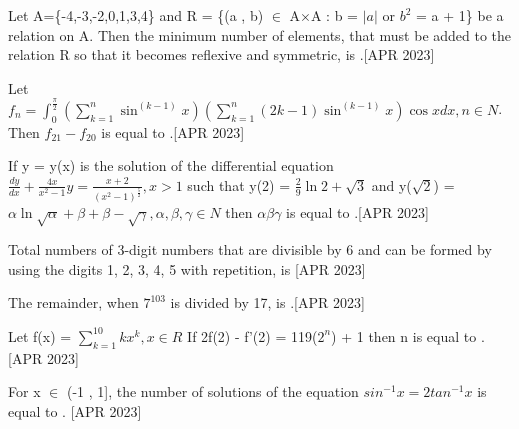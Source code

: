 \iffalse
  \title{Assignment}
  \author{ee24btech11030}
  \section{integer}
\fi

 \item Let A=\{-4,-3,-2,0,1,3,4\} and R = \{(a , b) $\in$ A$\times$A : b = $|a|$ or $b^2$ = a + 1\} be a relation on A. Then the minimum number of elements, that must be added to the relation R so that it becomes reflexive and symmetric, is  \underline{\hspace{1cm}}.\hfill{[APR 2023]}
    \bigskip
    
    \item Let $f_n = \int_{0}^{\frac{\pi}{2}}\left(\sum_{k=1}^{n}\sin^{(k - 1)}{x}\right)\left(\sum_{k=1}^{n}(2k - 1)\sin^{(k - 1)}{x}\right)\cos{x}dx , n \in N$. Then $f_{21} - f_{20}$ is equal to \underline{\hspace{1cm}}.\hfill{[APR 2023]}
    \bigskip
    
    \item If y = y(x) is the solution of the differential equation 
    $\frac{dy}{dx} + \frac{4x}{x^2 - 1}y = \frac{x + 2}{(x^2 - 1)^{\frac{5}{2}}} , x > 1$ such that y(2) = $\frac{2}{9}\ln{2 + \sqrt{3}}$ and y($\sqrt{2}$) = $\alpha\ln{\sqrt{\alpha} + \beta} + \beta - \sqrt{\gamma} , \alpha,\beta,\gamma \in N$ then $\alpha\beta\gamma$ is equal to \underline{\hspace{1cm}}.\hfill{[APR 2023]}
    \bigskip
    
    \item Total numbers of 3-digit numbers that are divisible by 6 and can be formed by using the digits 1, 2, 3, 4, 5 with repetition, is \underline{\hspace{1cm}}\hfill{[APR 2023]}
    \bigskip
    
    \item The remainder, when $7^{103}$ is divided by 17, is \underline{\hspace{1cm}}.\hfill{[APR 2023]}
    \bigskip
    
    \item Let f(x) = $\sum_{k=1}^{10}kx^k , x \in R $ If 2f(2) - f'(2) = 119($2^n$) + 1 then n is equal to \underline{\hspace{1cm}}. \hfill{[APR 2023]}
    \bigskip
    
    \item For x $\in$ (-1 , 1], the number of solutions of the equation $sin^{-1}{x} = 2 tan^{-1}{x}$ is equal to \underline{\hspace{1cm}}. \hfill{[APR 2023]}
    \bigskip
    
